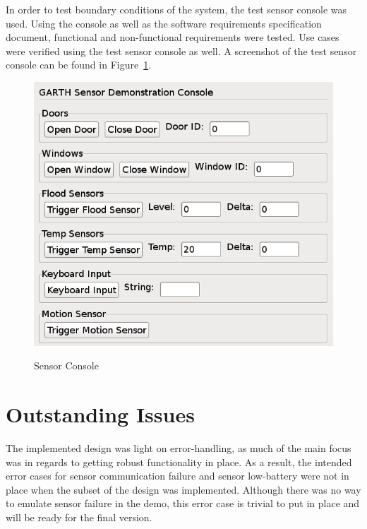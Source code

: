 \documentclass{article}
\begin{document}
In order to test boundary conditions of the system, the test sensor console was
used. Using the console as well as the software requirements
specification document, functional and non-functional requirements
were tested. Use cases were verified using the test sensor console as
well. A screenshot of the test sensor console can be found in Figure~\ref{fig:sensor_console}.

\begin{figure}[h]
    \centering
        \caption{Sensor Console}
        \scriptsize
        \setlength{\unitlength}{2.0em}
        \includegraphics[scale=0.5]{sensor_console.png}
        \normalsize
    \label{fig:sensor_console}
\end{figure}

\section{Outstanding Issues} %

The implemented design was light on error-handling, as much of the
main focus was in regards to getting robust functionality in place. As
a result, the intended error cases for sensor communication failure
and sensor low-battery were not in place when the subset of the design
was implemented. Although there was no way to emulate sensor failure
in the demo, this error case is trivial to put in place and will be
ready for the final version.
\end{document}
